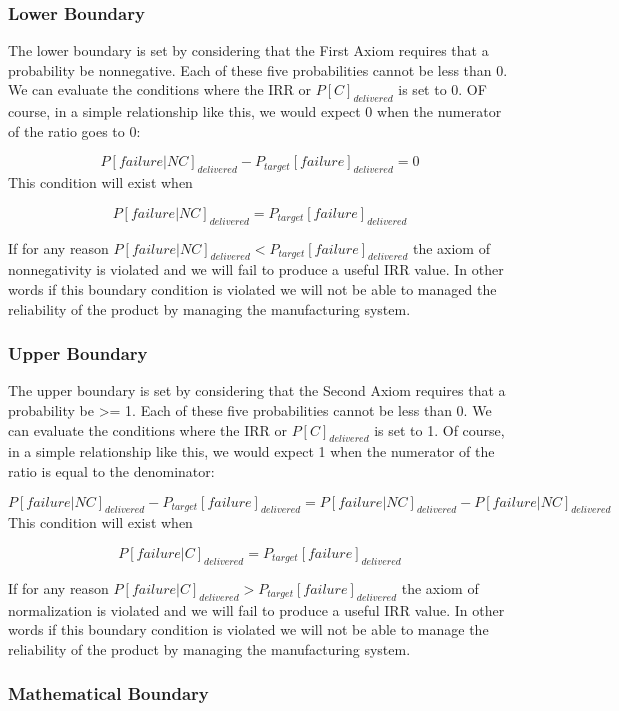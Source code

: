 \documentclass[
]{article}
\begin{document}
\subsubsection{Lower Boundary}\label{lower-boundary}

The lower boundary is set by considering that the First Axiom requires that a probability be nonnegative. Each of these five probabilities cannot be less than 0. We can evaluate the conditions where the IRR or \(P[C]_{delivered}\) is set to 0. OF course, in a simple relationship like this, we would expect 0 when the numerator of the ratio goes to 0:

\[P[failure|NC]_{delivered} - P_{target}[failure]_{delivered} = 0\]
This condition will exist when

\[P[failure|NC]_{delivered} = P_{target}[failure]_{delivered}\]

If for any reason \(P[failure|NC]_{delivered} < P_{target}[failure]_{delivered}\) the axiom of nonnegativity is violated and we will fail to produce a useful IRR value. In other words if this boundary condition is violated we will not be able to managed the reliability of the product by managing the manufacturing system.

\subsubsection{Upper Boundary}\label{upper-boundary}

The upper boundary is set by considering that the Second Axiom requires that a probability be \textgreater= 1. Each of these five probabilities cannot be less than 0. We can evaluate the conditions where the IRR or \(P[C]_{delivered}\) is set to 1. Of course, in a simple relationship like this, we would expect 1 when the numerator of the ratio is equal to the denominator:

\[P[failure|NC]_{delivered} - P_{target}[failure]_{delivered} = P[failure|NC]_{delivered} -  P[failure|NC]_{delivered}\]
This condition will exist when

\[P[failure|C]_{delivered} = P_{target}[failure]_{delivered}\]

If for any reason \(P[failure|C]_{delivered} > P_{target}[failure]_{delivered}\) the axiom of normalization is violated and we will fail to produce a useful IRR value. In other words if this boundary condition is violated we will not be able to manage the reliability of the product by managing the manufacturing system.

\subsubsection{Mathematical Boundary}\label{mathematical-boundary}
\end{document}
